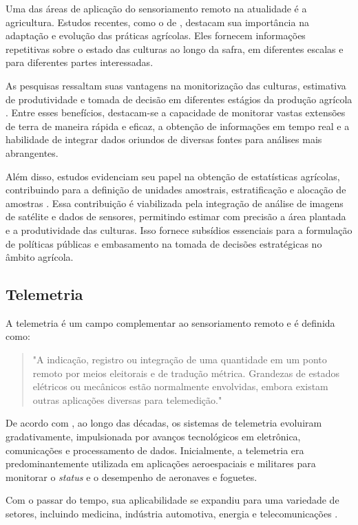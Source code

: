 Uma das áreas de aplicação do sensoriamento remoto na atualidade é a agricultura. Estudos recentes, como o de \textcite{weiss2020}, destacam sua importância na adaptação e evolução das práticas agrícolas. Eles fornecem informações repetitivas sobre o estado das culturas ao longo da safra, em diferentes escalas e para diferentes partes interessadas.

As pesquisas ressaltam suas vantagens na monitorização das culturas, estimativa de produtividade e tomada de decisão em diferentes estágios da produção agrícola \parencite{shanmugapriya2019, khanal2020}. Entre esses benefícios, destacam-se a capacidade de monitorar vastas extensões de terra de maneira rápida e eficaz, a obtenção de informações em tempo real e a habilidade de integrar dados oriundos de diversas fontes para análises mais abrangentes.

Além disso, estudos evidenciam seu papel na obtenção de estatísticas agrícolas, contribuindo para a definição de unidades amostrais, estratificação e alocação de amostras \parencite{carfagna2005}. Essa contribuição é viabilizada pela integração de análise de imagens de satélite e dados de sensores, permitindo estimar com precisão a área plantada e a produtividade das culturas. Isso fornece subsídios essenciais para a formulação de políticas públicas e embasamento na tomada de decisões estratégicas no âmbito agrícola.

\subsection{Telemetria}
A telemetria é um campo complementar ao sensoriamento remoto e é definida como:
\begin{quote}
"A indicação, registro ou integração de uma quantidade em um ponto remoto por meios eleitorais e de tradução métrica.  Grandezas de estados elétricos ou mecânicos estão normalmente envolvidas, embora existam outras aplicações diversas para telemedição." \parencite[{p. 3}]{telemetering1941}
\end{quote}

De acordo com \textcite{telemetry_systems2002}, ao longo das décadas, os sistemas de telemetria evoluiram gradativamente, impulsionada por avanços tecnológicos em eletrônica, comunicações e processamento de dados. Inicialmente, a telemetria era predominantemente utilizada em aplicações aeroespaciais e militares para monitorar o \textit{status} e o desempenho de aeronaves e foguetes. 

Com o passar do tempo, sua aplicabilidade se expandiu para uma variedade de setores, incluindo medicina, indústria automotiva, energia e telecomunicações \parencite{Lizhuang_telemetry2021, Hassanien2020, Ding_telemetry2017}.

